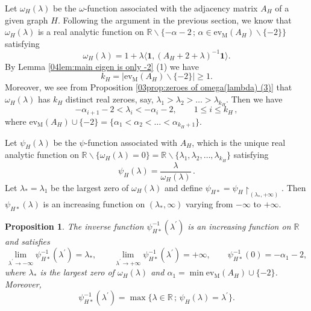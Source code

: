 \documentclass[12pt,a4paper]{article}
\newtheorem{proposition}[theorem]{Proposition}
\newcommand{\1}{{\bm 1}}
\numberwithin{equation}{section}
\begin{document}
Let $\omega_H(\lambda)$ be the $\omega$-function associated with
the adjacency matrix $A_H$ of a given graph $H$.
Following the argument in the previous section,
we know that $\omega_H(\lambda)$ is a real analytic function on
$\mathbb{R}\backslash
\{-\alpha-2\,;\, 
\alpha\in \mathrm{ev}_{\mathrm{M}}(A_H)\backslash\{-2\}\}$
satisfying
%
\begin{equation}\label{03eqn:def of omega(lambda) for H}
\omega_H(\lambda)
= 1+\lambda \langle\mathbf{1},(A_H+2+\lambda)^{-1}\mathbf{1}\rangle.
\end{equation}
%
By Lemma \ref{04lem:main eigen is only -2} (1) we have
\[
k_H=|\mathrm{ev}_{\mathrm{M}}(A_H)\backslash\{-2\}|\ge1.
\]
Moreover, we see 
from Proposition \ref{03prop:zeroes of omega(lambda) (3)} that
$\omega_H(\lambda)$ has $k_H$ distinct real zeroes,
say, $\lambda_1>\lambda_2>\dots>\lambda_{k_H}$.
Then we have
%
\begin{equation}\label{04eqn:interlacing of lambda and -2-alpha}
-\alpha_{i+1}-2<\lambda_i<-\alpha_{i}-2,
\qquad 1\le i\le k_H\,,
\end{equation}
%
where $\mathrm{ev}_{\mathrm{M}}(A_H)\cup \{-2\}
=\{\alpha_1<\alpha_2<\dots<\alpha_{k_H+1}\}$.

Let $\psi_H(\lambda)$ be the $\psi$-function associated with $A_H$,
which is the unique real analytic function
on $\mathbb{R}\backslash\{\omega_H(\lambda)=0\}
=\mathbb{R}\backslash\{\lambda_1, \lambda_2, \dots, \lambda_{k_H}\}$
satisfying
%
\begin{equation}\label{03eqn:def of psi(lambda) for H}
\psi_H(\lambda)=\frac{\lambda}{\omega_H(\lambda)}\,.
\end{equation}
%
Let $\lambda_*=\lambda_1$ be the largest zero of $\omega_H(\lambda)$
and define $\psi_{H*}=\psi_H\!\restriction_{(\lambda_*,+\infty)}$.
Then $\psi_{H*}(\lambda)$ is an increasing 
function on $(\lambda_*,\infty)$ varying from $-\infty$ to $+\infty$.


\begin{proposition}\label{04prop:inverse of psi_H}
The inverse function $\psi_{H*}^{-1}(\lambda^\prime)$ 
is an increasing function on $\mathbb{R}$
and satisfies 
\[
\lim_{\lambda^\prime\rightarrow-\infty}
\psi_{H*}^{-1}(\lambda^\prime)=\lambda_*,
\qquad
\lim_{\lambda^\prime\rightarrow+\infty}
\psi_{H*}^{-1}(\lambda^\prime)=+\infty,
\qquad
\psi_{H*}^{-1}(0)=-\alpha_1-2,
\]
where $\lambda_*$ is the largest zero of $\omega_H(\lambda)$
and $\alpha_1=\min \mathrm{ev}_{\mathrm{M}}(A_H)\cup\{-2\}$.
Moreover,
\begin{equation}\label{04eqn:inverse of psi_H}
\psi_{H*}^{-1}(\lambda^\prime)
=\max\{\lambda\in\mathbb{R}\,;\, \psi_H(\lambda)=\lambda^\prime\}.
\end{equation}
\end{proposition}
\end{document}
